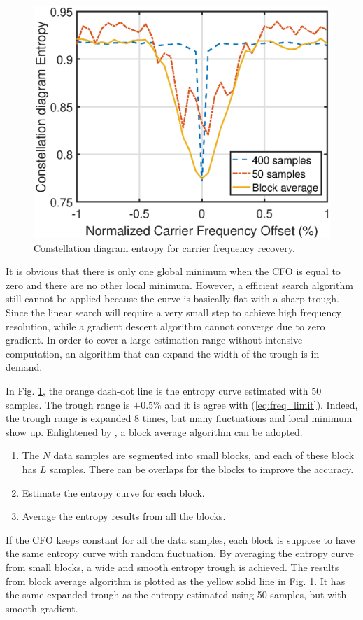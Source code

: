 \documentclass[journal,comsoc]{IEEEtran}
\begin{document}
\begin{figure}[ht]
\centering
\includegraphics[width=3 in]{pic/freq.eps}
\caption{Constellation diagram entropy for carrier frequency recovery.}
\label{fig:freq_entp} 
\end{figure}   

It is obvious that there is only one global minimum when the CFO is equal to zero and there are no other local minimum.
However, a efficient search algorithm still cannot be applied because the curve is basically flat with a sharp trough.
Since the linear search will require a very small step to achieve high frequency resolution, while a gradient descent algorithm cannot converge due to zero gradient.
In order to cover a large estimation range without intensive computation, an algorithm that can expand the width of the trough is in demand.


In Fig. \ref{fig:freq_entp}, the orange dash-dot line is the entropy curve estimated with 50 samples.
The trough range is \(\pm 0.5\%\) and it is agree with (\ref{eq:freq_limit}).
Indeed, the trough range is expanded 8 times, but many fluctuations and local minimum show up.
Enlightened by \cite{YuanlingHuang2007}, a block average algorithm can be adopted.
\begin{enumerate}
\item The \(N\) data samples are segmented into small blocks, and each of these block has \(L\) samples. There can be overlaps for the blocks to improve the accuracy.
\item Estimate the entropy curve for each block.
\item Average the entropy results from all the blocks.
\end{enumerate}
If the CFO keeps constant for all the data samples, each block is suppose to have the same entropy curve with random fluctuation.
By averaging the entropy curve from small blocks, a wide and smooth entropy trough is achieved.
The results from block average algorithm is plotted as the yellow solid line in Fig. \ref{fig:freq_entp}.
It has the same expanded trough as the entropy estimated using 50 samples, but with smooth gradient.
\end{document}
